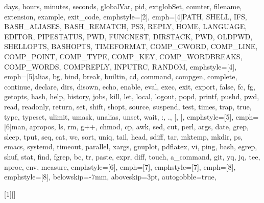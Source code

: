 {{         days, hours, minutes, seconds, globalVar, pid, extglobSet, counter, filename, extension, example,
         exit_code},
emphstyle=[2]{\color{variables-color}}, %
emph=[4]{PATH, SHELL, IFS, BASH_ALIASES, BASH_REMATCH, PS3, REPLY, HOME, LANGUAGE, EDITOR, PIPESTATUS, PWD, FUNCNEST,
         DIRSTACK, PWD, OLDPWD, SHELLOPTS, BASHOPTS, TIMEFORMAT, COMP_CWORD, COMP_LINE, COMP_POINT, COMP_TYPE, COMP_KEY,
         COMP_WORDBREAKS, COMP_WORDS, COMPREPLY, INPUTRC, RANDOM},
emphstyle=[4]{\color{environment-color}}, %
emph=[5]{alias, bg, bind, break, builtin, cd, command, compgen, complete, continue, declare, dirs, disown, echo, enable, eval,
         exec, exit, export, false, fc, fg, getopts, hash, help, history, jobs, kill, let, local, logout, popd, printf, pushd, pwd,
         read, readonly, return, set, shift, shopt, source, suspend, test, times, trap, true, type, typeset, ulimit, umask,
         unalias, unset, wait, :, ., [, ]},
emphstyle=[5]{\color{builtins-color}}, %
emph=[6]{man, apropos, ls, rm, g++, chmod, cp, awk, sed, cut, perl, args, date, grep, sleep, tput, seq, cat, wc, sort, uniq, tail,
         head, sdiff, tar, mktemp, mkdir, ps, emacs, systemd, timeout, parallel, xargs, gnuplot, pdflatex, vi, ping, bash,
         egrep, shuf, stat, find, fgrep, bc, tr, paste, expr, diff, touch, a_command, git, yq, jq, tee, nproc, env, measure},
emphstyle=[6]{\color{external-color}}, %
emph=[7]{},
emphstyle=[7]{\color{variables-color}}, %
emph=[8]{},
emphstyle=[8]{\color{builtins-color}}, %
%
belowskip=-7mm,
aboveskip=3pt,
autogobble=true, %
}

[1][] %
    {\lstset{style=MyBash, #1}}
    {}

\makeatletter
{}
\makeatother

\def\bash{\lstinline[style=MyBash, basicstyle=\ttfamily\color{black}]}



